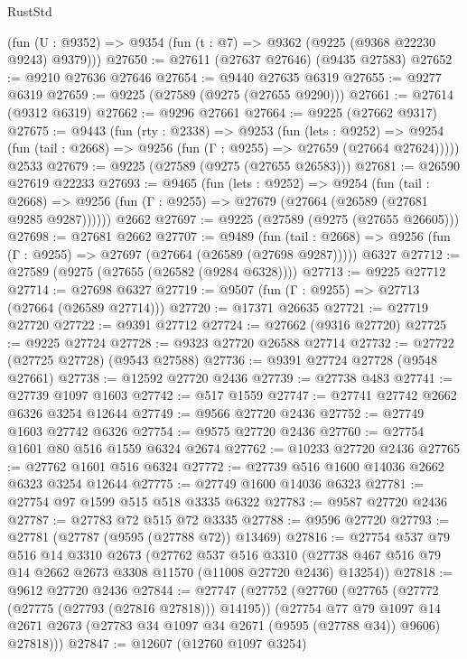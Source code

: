 \begin{lexlean}{RustStd}
\begin{coremodule}
    (fun (U : @9352) => @9354 (fun (t : @7) => @9362 (@9225 (@9368 @22230 @9243) @9379)))
@27650 := @27611 (@27637 @27646) (@9435 @27583)
@27652 := @9210 @27636 @27646
@27654 := @9440 @27635 @6319
@27655 := @9277 @6319
@27659 := @9225 (@27589 (@9275 (@27655 @9290)))
@27661 := @27614 (@9312 @6319)
@27662 := @9296 @27661
@27664 := @9225 (@27662 @9317)
@27675 := @9443
    (fun (rty : @2338) =>
    @9253
      (fun (lets : @9252) =>
      @9254 (fun (tail : @2668) => @9256 (fun (Γ : @9255) => @27659 (@27664 @27624)))))
    @2533
@27679 := @9225 (@27589 (@9275 (@27655 @26583)))
@27681 := @26590 @27619 @22233
@27693 := @9465
    (fun (lets : @9252) =>
    @9254
      (fun (tail : @2668) =>
      @9256 (fun (Γ : @9255) => @27679 (@27664 (@26589 (@27681 @9285 @9287))))))
    @2662
@27697 := @9225 (@27589 (@9275 (@27655 @26605)))
@27698 := @27681 @2662
@27707 := @9489
    (fun (tail : @2668) => @9256 (fun (Γ : @9255) => @27697 (@27664 (@26589 (@27698 @9287)))))
    @6327
@27712 := @27589 (@9275 (@27655 (@26582 (@9284 @6328))))
@27713 := @9225 @27712
@27714 := @27698 @6327
@27719 := @9507 (fun (Γ : @9255) => @27713 (@27664 (@26589 @27714)))
@27720 := @17371 @26635
@27721 := @27719 @27720
@27722 := @9391 @27712
@27724 := @27662 (@9316 @27720)
@27725 := @9225 @27724
@27728 := @9323 @27720 @26588 @27714
@27732 := @27722 (@27725 @27728) (@9543 @27588)
@27736 := @9391 @27724 @27728 (@9548 @27661)
@27738 := @12592 @27720 @2436
@27739 := @27738 @483
@27741 := @27739 @1097 @1603
@27742 := @517 @1559
@27747 := @27741 @27742 @2662 @6326 @3254 @12644
@27749 := @9566 @27720 @2436
@27752 := @27749 @1603 @27742 @6326
@27754 := @9575 @27720 @2436
@27760 := @27754 @1601 @80 @516 @1559 @6324 @2674
@27762 := @10233 @27720 @2436
@27765 := @27762 @1601 @516 @6324
@27772 := @27739 @516 @1600 @14036 @2662 @6323 @3254 @12644
@27775 := @27749 @1600 @14036 @6323
@27781 := @27754 @97 @1599 @515 @518 @3335 @6322
@27783 := @9587 @27720 @2436
@27787 := @27783 @72 @515 @72 @3335
@27788 := @9596 @27720
@27793 := @27781 (@27787 (@9595 (@27788 @72)) @13469)
@27816 := @27754
    @537
    @79
    @516
    @14
    @3310
    @2673
    (@27762
      @537
      @516
      @3310
      (@27738 @467 @516 @79 @14 @2662 @2673 @3308 @11570 (@11008 @27720 @2436) @13254))
@27818 := @9612 @27720 @2436
@27844 := @27747
    (@27752
      (@27760
        (@27765 (@27772 (@27775 (@27793 (@27816 @27818))) @14195))
        (@27754
          @77
          @79
          @1097
          @14
          @2671
          @2673
          (@27783 @34 @1097 @34 @2671 (@9595 (@27788 @34)) @9606)
          @27818)))
@27847 := @12607 (@12760 @1097 @3254)

\end{coremodule}
\end{lexlean}
